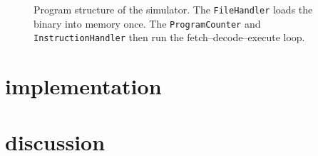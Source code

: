 \documentclass{article}
\begin{document}
\begin{figure}[htbp]
\caption{Program structure of the simulator. The \texttt{FileHandler} loads
the binary into memory once. The \texttt{ProgramCounter} and
\texttt{InstructionHandler} then run the fetch--decode--execute loop.}
\label{fig:program-structure}
\end{figure}

\section{implementation}
\section{discussion}
\end{document}
